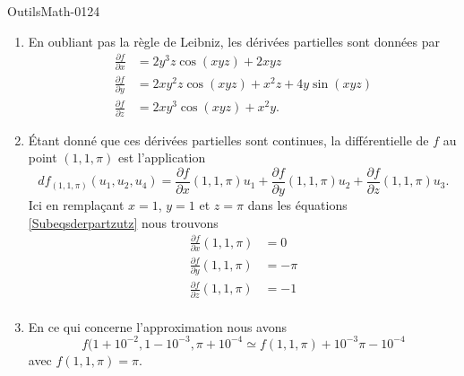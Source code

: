 
\begin{corrige}{OutilsMath-0124}

	\begin{enumerate}
		\item
		      En oubliant pas la règle de Leibniz, les dérivées partielles sont données par
		      \begin{subequations}        \label{Subeqsderpartzutz}
			      \begin{align}
				      \frac{ \partial f }{ \partial x } & =2y^3z\cos(xyz)+2xyz              \\
				      \frac{ \partial f }{ \partial y } & =2xy^2z\cos(xyz)+x^2z+4y\sin(xyz) \\
				      \frac{ \partial f }{ \partial z } & =2xy^3\cos(xyz)+x^2y.
			      \end{align}
		      \end{subequations}
		\item
		      Étant donné que ces dérivées partielles sont continues, la différentielle de \( f\) au point \( (1,1,\pi)\) est l'application
		      \begin{equation}
			      df_{(1,1,\pi)}(u_1,u_2,u_4)=\frac{ \partial f }{ \partial x }(1,1,\pi)u_1+\frac{ \partial f }{ \partial y }(1,1,\pi)u_2+\frac{ \partial f }{ \partial z }(1,1,\pi)u_3.
		      \end{equation}
		      Ici en remplaçant \( x=1\), \( y=1\) et $z=\pi$ dans les équations \eqref{Subeqsderpartzutz} nous trouvons
		      \begin{subequations}
			      \begin{align}
				      \frac{ \partial f }{ \partial x }(1,1,\pi) & =0    \\
				      \frac{ \partial f }{ \partial y }(1,1,\pi) & =-\pi \\
				      \frac{ \partial f }{ \partial z }(1,1,\pi) & =-1   \\
			      \end{align}
		      \end{subequations}
		\item
		      En ce qui concerne l'approximation nous avons
		      \begin{equation}
			      f(1+10^{-2},1-10^{-3},\pi+10^{-4}\simeq f(1,1,\pi)+10^{-3}\pi-10^{-4}
		      \end{equation}
		      avec \( f(1,1,\pi)=\pi\).
	\end{enumerate}

\end{corrige}
